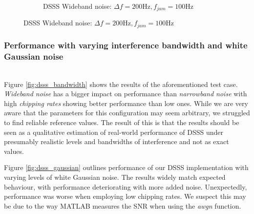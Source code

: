 \begin{figure}[H]
\begin{subfigure}[b]{0.5\textwidth}
						\caption{DSSS Wideband noise: $\Delta f = 200 \text{Hz}, f_{jam} = 100\text{Hz}$}
						\label{fig:dsss_wideband}
					\end{subfigure}
				\end{figure}
				
		
		\subsubsection{Performance with varying interference bandwidth and white Gaussian noise}~\\
			Figure \ref{fig:dsss_bandwidth} shows the results of the aforementioned test case.
			\emph{Wideband noise} has a bigger impact on performance than \emph{narrowband noise} with high \emph{chipping rates} showing better performance than low ones.
			While we are very aware that the parameters for this configuration may seem arbitrary, we struggled to find reliable reference values. The result of this is that the results should be seen as a qualitative estimation of real-world performance of DSSS under presumably realistic levels and bandwidths of interference and not as exact values. 
			
			Figure \ref{fig:dsss_gaussian} outlines performance of our DSSS implementation with varying levels of white Gaussian noise.
			The results widely match expected behaviour, with performance deteriorating with more added noise.
			Unexpectedly, performance was worse when employing low chipping rates.
			We suspect this may be due to the way MATLAB measures the SNR when using the \emph{awgn} function.
			
